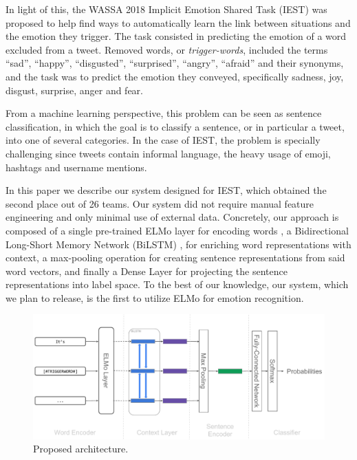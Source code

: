 \documentclass[11pt,a4paper]{article}
\newcommand{\Acronym}[1]{\mbox{#1}}
\begin{document}
In light of this, the \Acronym{WASSA} 2018 Implicit Emotion Shared Task (\Acronym{IEST}) \cite{klinger2018iest} was proposed to help find ways to automatically learn the link between situations and the emotion they trigger. The task consisted in predicting the emotion of a word excluded from a tweet. Removed words, or \textit{trigger-words}, included the terms ``sad'', ``happy'', ``disgusted'', ``surprised'', ``angry'', ``afraid'' and their synonyms, and the task was to predict the emotion they conveyed, specifically sadness, joy, disgust, surprise, anger and fear.

From a machine learning perspective, this problem can be seen as sentence classification, in which the goal is to classify a sentence, or in particular a tweet, into one of several categories. In the case of \Acronym{IEST}, the problem is specially challenging since tweets contain informal language, the heavy usage of emoji, hashtags and username mentions.

In this paper we describe our system designed for \Acronym{IEST}, which obtained the second place out of 26 teams. Our system did not require manual feature engineering and only minimal use of external data. Concretely, our approach is composed of a single pre-trained \Acronym{ELMo} layer for encoding words \cite{peters2018deep}, a Bidirectional Long-Short Memory Network (\Acronym{BiLSTM}) \cite{graves2005framewise, graves2013speech}, for enriching word representations with context, a max-pooling operation for creating sentence representations from said word vectors, and finally a Dense Layer for projecting the sentence representations into label space. To the best of our knowledge, our system, which we plan to release, is the first to utilize ELMo for emotion recognition. 




\begin{figure}
    \centering
    \includegraphics[scale=0.6]{images/iest_architecture.pdf}
    \caption{Proposed architecture.}
    \label{fig:architecture}
\end{figure}
\end{document}
